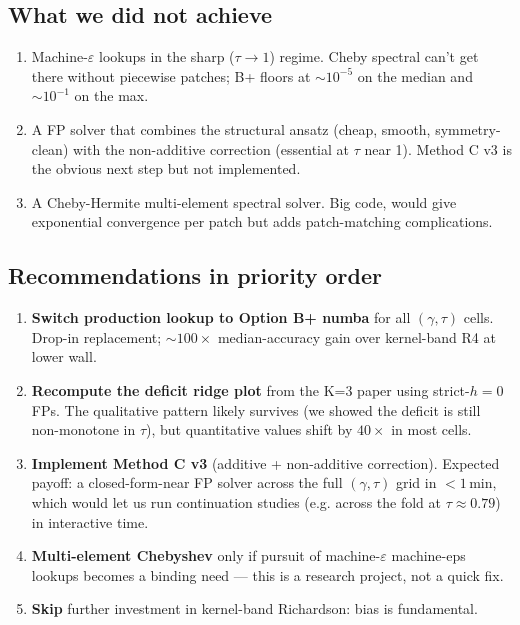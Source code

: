 \documentclass[11pt]{article}
\begin{document}
\subsection{What we did not achieve}

\begin{enumerate}\itemsep1pt
  \item Machine-$\varepsilon$ lookups in the sharp ($\tau \to 1$) regime.
        Cheby spectral can't get there without piecewise patches; B+
        floors at $\sim 10^{-5}$ on the median and $\sim 10^{-1}$ on
        the max.
  \item A FP solver that combines the structural ansatz (cheap, smooth,
        symmetry-clean) with the non-additive correction (essential at
        $\tau$ near 1). Method C v3 is the obvious next step but not
        implemented.
  \item A Cheby-Hermite multi-element spectral solver. Big code, would
        give exponential convergence per patch but adds patch-matching
        complications.
\end{enumerate}

\subsection{Recommendations in priority order}

\begin{enumerate}\itemsep1pt
  \item \textbf{Switch production lookup to Option B+ numba} for all
        $(\gamma, \tau)$ cells. Drop-in replacement; $\sim 100{\times}$
        median-accuracy gain over kernel-band R4 at lower wall.
  \item \textbf{Recompute the deficit ridge plot} from the K=3 paper
        using strict-$h{=}0$ FPs. The qualitative pattern likely
        survives (we showed the deficit is still non-monotone in
        $\tau$), but quantitative values shift by $40{\times}$ in
        most cells.
  \item \textbf{Implement Method C v3} (additive + non-additive
        correction). Expected payoff: a closed-form-near FP solver
        across the full $(\gamma, \tau)$ grid in $< 1\,\mathrm{min}$,
        which would let us run continuation studies (e.g. across
        the fold at $\tau \approx 0.79$) in interactive time.
  \item \textbf{Multi-element Chebyshev} only if pursuit of
        machine-$\varepsilon$ machine-eps lookups becomes a binding need
        --- this is a research project, not a quick fix.
  \item \textbf{Skip} further investment in kernel-band Richardson:
        bias is fundamental.
\end{enumerate}
\end{document}

